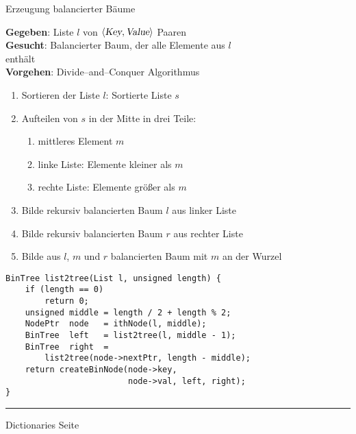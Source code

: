 
\begin{slide}{}
\normalsize

\begin{center}
Erzeugung balancierter B\"aume
\end{center}
\vspace*{0.5cm}

\footnotesize
\textbf{Gegeben}: Liste $l$ von $\langle\textsl{Key}, \textsl{Value}\rangle$ Paaren \\[0.3cm]
\textbf{Gesucht}: Balancierter Baum, der alle Elemente aus $l$ \\
\hspace*{2.88cm} enth\"alt \\[0.3cm]
\textbf{Vorgehen}: Divide--and--Conquer Algorithmus
\begin{enumerate}
\item Sortieren der Liste $l$: Sortierte Liste $s$
\item Aufteilen von $s$ in der Mitte in drei Teile:
  \begin{enumerate}
  \item mittleres Element $m$
  \item linke Liste: Elemente kleiner als $m$
  \item rechte Liste: Elemente gr\"o{\ss}er als $m$
  \end{enumerate}
\item Bilde rekursiv balancierten Baum $l$ aus linker Liste
\item Bilde rekursiv balancierten Baum $r$ aus rechter Liste
\item Bilde aus $l$, $m$ und $r$ balancierten Baum mit $m$ an der Wurzel
\end{enumerate}

\begin{verbatim}
BinTree list2tree(List l, unsigned length) {
    if (length == 0)
        return 0;
    unsigned middle = length / 2 + length % 2;
    NodePtr  node   = ithNode(l, middle);
    BinTree  left   = list2tree(l, middle - 1);
    BinTree  right  = 
        list2tree(node->nextPtr, length - middle);
    return createBinNode(node->key, 
                         node->val, left, right);    
}
\end{verbatim}

\vspace*{\fill}
\tiny \addtocounter{mypage}{1}
\rule{17cm}{1mm}
Dictionaries  \hspace*{\fill} Seite 
\end{slide}


